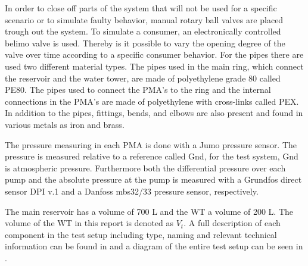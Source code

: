 In order to close off parts of the system that will not be used for a specific scenario or to simulate faulty behavior, manual rotary ball valves are placed trough out the system. 
To simulate a consumer, an electronically controlled belimo valve is used. Thereby is it possible to vary the opening degree of the valve over time according to a specific consumer behavior. 
For the pipes there are used two different material types. The pipes used in the main ring, which connect the reservoir and the water tower, are made of polyethylene grade 80 called PE80\cite{PE100}.
 The pipes used to connect the PMA's to the ring and the internal connections in the PMA's are made of polyethylene with cross-links called PEX. In addition to the pipes, fittings, bends, and elbows are also present and found in various metals as iron and brass.     

The pressure measuring in each PMA is done with a Jumo pressure sensor. The pressure is measured relative to a reference called Gnd, for the test system, Gnd is atmospheric pressure. Furthermore both the differential pressure over each pump and the absolute pressure at the pump is measured with a Grundfos direct sensor DPI v.1 and a Danfoss mbs32/33 pressure sensor, respectively.    

The main reservoir has a volume of 700 L and the WT a volume of 200 L. The volume of the WT in this report is denoted as $V_t$. A full description of each component in the test setup including type, naming and relevant technical information can be found in  and a diagram of the entire test setup can be seen in .
